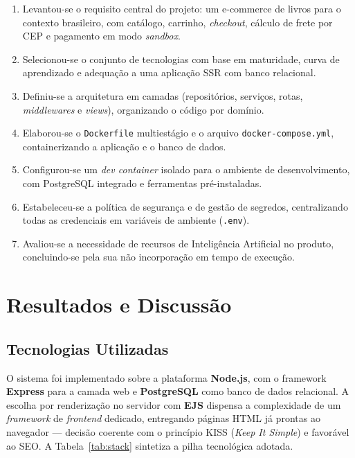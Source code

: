 \documentclass[a4paper,12pt]{article}
\begin{document}
\begin{enumerate}[leftmargin=2em]
    \item Levantou-se o requisito central do projeto: um e-commerce de livros para o
    contexto brasileiro, com catálogo, carrinho, \emph{checkout}, cálculo de frete por
    CEP e pagamento em modo \emph{sandbox}.
    \item Selecionou-se o conjunto de tecnologias com base em maturidade, curva de
    aprendizado e adequação a uma aplicação SSR com banco relacional.
    \item Definiu-se a arquitetura em camadas (repositórios, serviços, rotas,
    \emph{middlewares} e \emph{views}), organizando o código por domínio.
    \item Elaborou-se o \texttt{Dockerfile} multiestágio e o arquivo
    \texttt{docker-compose.yml}, containerizando a aplicação e o banco de dados.
    \item Configurou-se um \emph{dev container} isolado para o ambiente de
    desenvolvimento, com PostgreSQL integrado e ferramentas pré-instaladas.
    \item Estabeleceu-se a política de segurança e de gestão de segredos, centralizando
    todas as credenciais em variáveis de ambiente (\texttt{.env}).
    \item Avaliou-se a necessidade de recursos de Inteligência Artificial no produto,
    concluindo-se pela sua não incorporação em tempo de execução.
\end{enumerate}

\section{Resultados e Discussão}

\subsection{Tecnologias Utilizadas}

O sistema foi implementado sobre a plataforma \textbf{Node.js}, com o framework
\textbf{Express} para a camada web e \textbf{PostgreSQL} como banco de dados
relacional. A escolha por renderização no servidor com \textbf{EJS} dispensa a
complexidade de um \emph{framework} de \emph{frontend} dedicado, entregando páginas
HTML já prontas ao navegador --- decisão coerente com o princípio KISS (\emph{Keep It
Simple}) e favorável ao SEO. A Tabela~\ref{tab:stack} sintetiza a pilha tecnológica
adotada.
\end{document}
